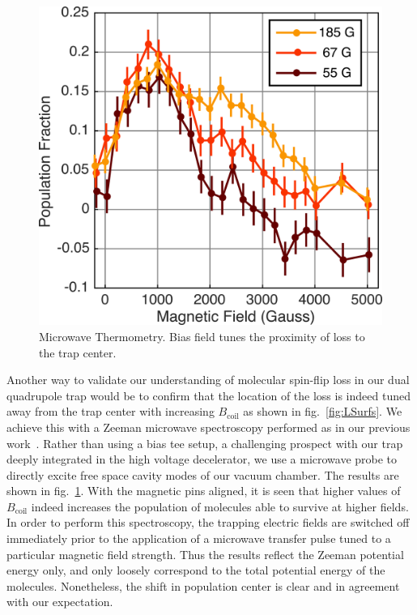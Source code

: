 \documentclass[%
 reprint,
groupedaddress,
 amsmath,amssymb,
 aps,
prl,
]{revtex4-1}
\begin{document}
\begin{figure}[tb]
\includegraphics[width=\linewidth]{MWSpec/MW-therm-dave-heat.png}%
\caption{
Microwave Thermometry. Bias field tunes the proximity of loss to the trap center. 
\label{fig:spec}}
\end{figure}

Another way to validate our understanding of molecular spin-flip loss in our dual quadrupole trap would be to confirm that the location of the loss is indeed tuned away from the trap center with increasing $B_\text{coil}$ as shown in fig.~\ref{fig:LSurfs}. We achieve this with a Zeeman microwave spectroscopy performed as in our previous work~\cite{Stuhl2012evap}. Rather than using a bias tee setup, a challenging prospect with our trap deeply integrated in the high voltage decelerator, we use a microwave probe to directly excite free space cavity modes of our vacuum chamber. The results are shown in fig.~\ref{fig:spec}. With the magnetic pins aligned, it is seen that higher values of $B_{\text{coil}}$ indeed increases the population of molecules able to survive at higher fields. In order to perform this spectroscopy, the trapping electric fields are switched off immediately prior to the application of a microwave transfer pulse tuned to a particular magnetic field strength. Thus the results reflect the Zeeman potential energy only, and only loosely correspond to the total potential energy of the molecules. Nonetheless, the shift in population center is clear and in agreement with our expectation.  %
\end{document}
